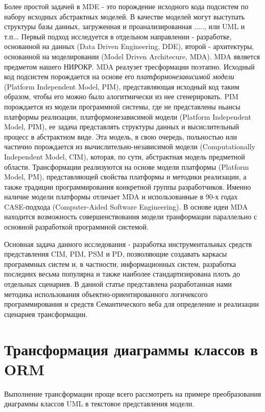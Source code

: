 \documentclass[12pt]{article}
\begin{document}
Более простой задачей в MDE - это порождение исходного кода подсистем по набору исходных абстрактных моделей.  В качестве моделей могут выступать структуры базы данных, загруженная и проанализированная ....., или UML и т.п...  Первый подход исследуется в отдельном направлении - разработке, основанной на данных (Data Driven Engineering, DDE), второй - архитектуры, основанной на моделировании (Model Driven Architecure, MDA).  MDA является предметом нашего НИРОКР.  MDA реалузет тресформации поэтапно.  Исходный код подсистем порождается на основе его \emph{платформонезависимой модели} (Platform Independent Model, PIM), представляющая исходный код таким образом, чтобы его можно было алогитмически из нее сгенерировать.  PIM порождается из модели программной системы, где не представлены ньансы платформы реализации, платформонезависимой модели (Platform Independent Model, PIM), ее задача представлять структуры данных и высислительный процесс в абстрактном виде.  Эта модель, в свою очередь, польностью или частично порождается из вычислительно-независимой модели (Computationally Independent Model, CIM), которая, по сути, абстрактная модель предметной области.  Трансформации реализуются на основе модели платформы (Platform Model, PM), представляющей свойства платформы и методики реализации, а также традиции программирования конкретной группы разработчиков.  Именно наличие модели платформы отличает MDA и использованные в 90-х годах CASE-подхода (Computer-Aided Software Engineering).  В основе идеи MDA находится  возможность совершенствования модели транформации параллельно с основной разработкой программной системой.

Основная задача данного исследования - разработка инструментальных средств представления CIM, PIM, PSM и PD, позволяющие создавать каркасы программных систем и, в частности, информационных систем, разработка последних весьма популярна и также наиболее стандартизирована плоть до отдельных сценариев.  В данной статье представлена разработанная нами методика использования объектно-ориентированного логичексого программирования и средств Семантического веба для определение и реализации сценариев трансформации.



\section{Трансформация диаграммы классов в ORM}
\label{sec:trorm}

Выполнение трансформации проще всего рассмотреть на примере преобразования диаграммы классов UML в текстовое представления модели.
\end{document}
